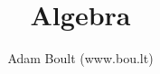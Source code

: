 \documentclass[oneside]{book}
\begin{document}
\author{Adam Boult (www.bou.lt)}
\title{Algebra}
\maketitle

\setcounter{tocdepth}{0}
\tableofcontents


\end{document}
